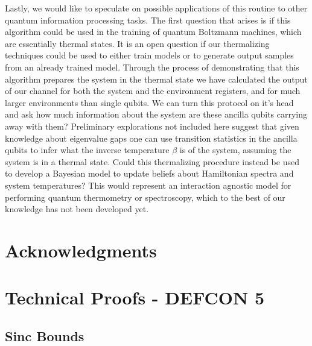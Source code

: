 \documentclass{article}
\begin{document}
Lastly, we would like to speculate on possible applications of this routine to other quantum information processing tasks. The first question that arises is if this algorithm could be used in the training of quantum Boltzmann machines, which are essentially thermal states. It is an open question if our thermalizing techniques could be used to either train models or to generate output samples from an already trained model. Through the process of demonstrating that this algorithm prepares the system in the thermal state we have calculated the output of our channel for both the system and the environment registers, and for much larger environments than single qubits. We can turn this protocol on it's head and ask how much information about the system are these ancilla qubits carrying away with them? Preliminary explorations not included here suggest that given knowledge about eigenvalue gaps one can use transition statistics in the ancilla qubits to infer what the inverse temperature $\beta$ is of the system, assuming the system is in a thermal state. Could this thermalizing procedure instead be used to develop a Bayesian model to update beliefs about Hamiltonian spectra and system temperatures? This would represent an interaction agnostic model for performing quantum thermometry or spectroscopy, which to the best of our knowledge has not been developed yet. 

\section*{Acknowledgments}





\appendix 


\section{Technical Proofs - DEFCON 5} \label{sec:appendix}
\subsection{Sinc Bounds} \label{sec:appendix_sinc}
\end{document}
